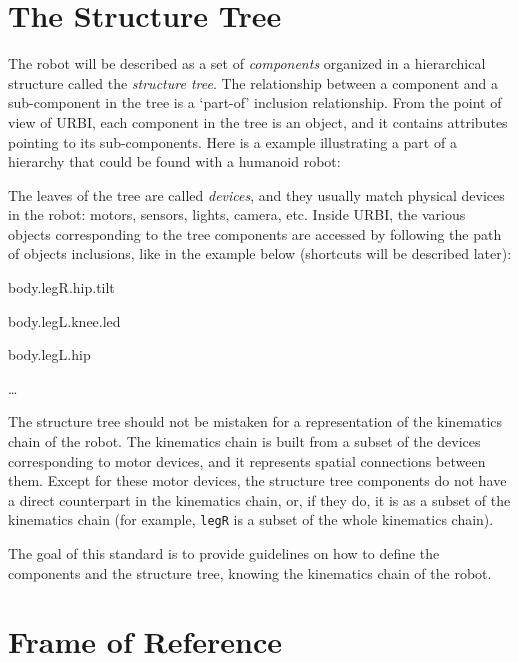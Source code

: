 \documentclass[a4paper]{article}
\begin{document}
\section[The Structure Tree]{The Structure
Tree}
{
\textsf{The robot will be described as a set of
}\textsf{\textit{components}}\textsf{ organized in a hierarchical
structure called the }\textsf{\textit{structure tree}}\textsf{. The
relationship between a component and a sub-component in the tree is a
‘part-of’ inclusion relationship. From the point of view of URBI, each
component in the tree is an object, and it contains attributes pointing
to its sub-components. Here is a example illustrating a part of a
hierarchy that could be found with a humanoid robot:}}



\begin{figure}
\centering
\end{figure}
{
\textsf{The leaves of the tree are called
}\textsf{\textit{devices}}\textsf{, and they usually match physical
devices in the robot: motors, sensors, lights, camera, etc. Inside
URBI, the various objects corresponding to the tree components are
accessed by following the path of objects inclusions, like in the
example below (shortcuts will be described later):}}

{
body.legR.hip.tilt}

{
body.legL.knee.led}

{
body.legL.hip}

{
…}


The structure tree should not be mistaken for a representation of the
kinematics chain of the robot. The kinematics chain is built from a
subset of the devices corresponding to motor devices, and it represents
spatial connections between them. Except for these motor devices, the
structure tree components do not have a direct counterpart in the
kinematics chain, or, if they do, it is as a subset of the kinematics
chain (for example, \texttt{legR} is a subset of the whole kinematics
chain).


The goal of this standard is to provide guidelines on how to define the
components and the structure tree, knowing the kinematics chain of the
robot.

\section[Frame of Reference]{Frame of
Reference}
\end{document}
